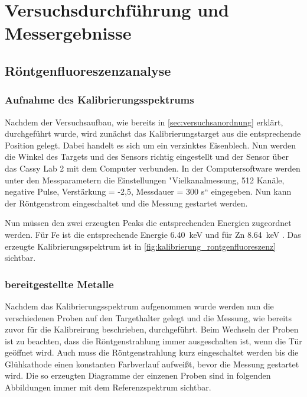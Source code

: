 \documentclass[12pt,english,ngerman]{scrartcl}
\begin{document}
\section{Versuchsdurchführung und Messergebnisse}\label{sec:versuchsdurchfuehrung_messergebnisse}

\subsection{Röntgenfluoreszenzanalyse}

\subsubsection{Aufnahme des Kalibrierungsspektrums}

Nachdem der Versuchsaufbau, wie bereits in \autoref{sec:versuchsanordnung} erklärt, durchgeführt wurde,
wird zunächst das Kalibrierungstarget aus die entsprechende Position gelegt. Dabei handelt es sich um 
ein verzinktes Eisenblech. Nun werden die Winkel des Targets und des Sensors richtig eingestellt und der
Sensor über das Cassy Lab 2 mit dem Computer verbunden.
In der Computersoftware werden unter den Messparametern die Einstellungen 
"Vielkanalmessung, 512 Kanäle, negative Pulse, Verstärkung = -2,5, Messdauer = 300 s“
eingegeben. Nun kann der Röntgenstrom eingeschaltet und die Messung gestartet werden.

Nun müssen den zwei erzeugten Peaks die entsprechenden Energien zugeordnet werden. 
Für Fe ist die entsprechende Energie \SI{6.40}{keV} und für Zn \SI{8.64}{keV} \cite{unterlagen_rontgenfluorenzenz}.
Das erzeugte Kalibrierungsspektrum ist in \autoref{fig:kalibrierung_rontgenfluoreszenz} sichtbar.


\subsubsection{bereitgestellte Metalle}

Nachdem das Kalibrierungsspektrum aufgenommen wurde werden nun die verschiedenen Proben auf den Targethalter gelegt 
und die Messung, wie bereits zuvor für die Kalibreirung beschrieben, durchgeführt. Beim Wechseln der Proben ist zu beachten, 
dass die Röntgenstrahlung immer ausgeschalten ist, wenn die Tür geöffnet wird. Auch muss die Röntgenstrahlung kurz 
eingeschaltet werden bis die Glühkathode einen konstanten Farbverlauf aufweißt, bevor die Messung gestartet wird.
Die so erzeugten Diagramme der einzenen Proben sind in folgenden Abbildungen immer mit dem Referenzspektrum sichtbar.
\end{document}
